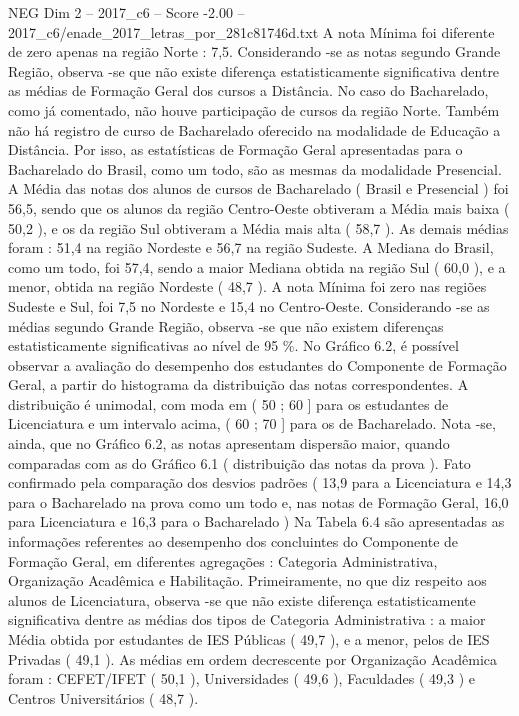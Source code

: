 \begin{textsample}{NEG Dim 2 – 2017\_c6 – Score -2.00 – 2017\_c6/enade\_2017\_letras\_por\_281c81746d.txt}
A nota Mínima foi diferente de zero apenas na região Norte : 7,5.
Considerando -se as notas segundo Grande Região, observa -se que não existe diferença estatisticamente significativa dentre as médias de Formação Geral dos cursos a Distância.
No caso do Bacharelado, como já comentado, não houve participação de cursos da região Norte.
Também não há registro de curso de Bacharelado oferecido na modalidade de Educação a Distância.
Por isso, as estatísticas de Formação Geral apresentadas para o Bacharelado do Brasil, como um todo, são as mesmas da modalidade Presencial.
A Média das notas dos alunos de cursos de Bacharelado ( Brasil e Presencial ) foi 56,5, sendo que os alunos da região Centro-Oeste obtiveram a Média mais baixa ( 50,2 ), e os da região Sul obtiveram a Média mais alta ( 58,7 ).
As demais médias foram : 51,4 na região Nordeste e 56,7 na região Sudeste.
A Mediana do Brasil, como um todo, foi 57,4, sendo a maior Mediana obtida na região Sul ( 60,0 ), e a menor, obtida na região Nordeste ( 48,7 ).
A nota Mínima foi zero nas regiões Sudeste e Sul, foi 7,5 no Nordeste e 15,4 no Centro-Oeste.
Considerando -se as médias segundo Grande Região, observa -se que não existem diferenças estatisticamente significativas ao nível de 95 \%.
No Gráfico 6.2, é possível observar a avaliação do desempenho dos estudantes do Componente de Formação Geral, a partir do histograma da distribuição das notas correspondentes.
A distribuição é unimodal, com moda em ( 50 ; 60 ] para os estudantes de Licenciatura e um intervalo acima, ( 60 ; 70 ] para os de Bacharelado.
Nota -se, ainda, que no Gráfico 6.2, as notas apresentam dispersão maior, quando comparadas com as do Gráfico 6.1 ( distribuição das notas da prova ).
Fato confirmado pela comparação dos desvios padrões ( 13,9 para a Licenciatura e 14,3 para o Bacharelado na prova como um todo e, nas notas de Formação Geral, 16,0 para Licenciatura e 16,3 para o Bacharelado ) Na Tabela 6.4 são apresentadas as informações referentes ao desempenho dos concluintes do Componente de Formação Geral, em diferentes agregações : Categoria Administrativa, Organização Acadêmica e Habilitação.
Primeiramente, no que diz respeito aos alunos de Licenciatura, observa -se que não existe diferença estatisticamente significativa dentre as médias dos tipos de Categoria Administrativa : a maior Média obtida por estudantes de IES Públicas ( 49,7 ), e a menor, pelos de IES Privadas ( 49,1 ).
As médias em ordem decrescente por Organização Acadêmica foram : CEFET/IFET ( 50,1 ), Universidades ( 49,6 ), Faculdades ( 49,3 ) e Centros Universitários ( 48,7 ).

\end{textsample}
